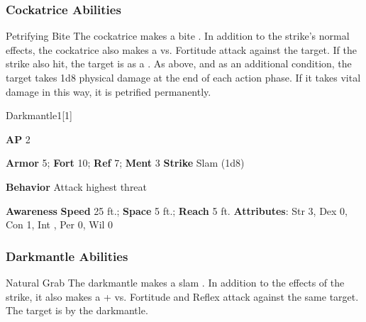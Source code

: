 \subsubsection{Cockatrice Abilities}

\begin{freeability}{Petrifying Bite}
The cockatrice makes a bite .
In addition to the strike's normal effects, the cockatrice also makes a  vs. Fortitude attack against the target.
\hit If the strike also hit, the target is  as a .
\crit As above, and as an additional condition, the target takes 1d8 physical damage at the end of each action phase.
If it takes vital damage in this way, it is petrified permanently.
\end{freeability}

\begin{monsection}{Darkmantle}{1}[1]
\vspace{-1em}\vspace{-1em}
\begin{spellcontent}
\begin{spelltargetinginfo}
{\textbf{AP} 2}

\pari \textbf{Armor} 5;
\textbf{Fort} 10;
\textbf{Ref} 7;
\textbf{Ment} 3
\pari \textbf{Strike} Slam  (1d8)



\pari \textbf{Behavior} Attack highest threat
\end{spelltargetinginfo}
\end{spellcontent}

\begin{monsterfooter}
\pari \textbf{Awareness} 
\pari \textbf{Speed} 25 ft.;
\textbf{Space} 5 ft.;
\textbf{Reach} 5 ft.
\pari \textbf{Attributes}:
Str 3,
Dex 0,
Con 1,
Int ,
Per 0,
Wil 0
\end{monsterfooter}
\end{monsection}


\subsubsection{Darkmantle Abilities}

\begin{freeability}{Natural Grab}
The darkmantle makes a slam .
In addition to the effects of the strike, it also makes a + vs. Fortitude and Reflex attack against the same target.
\hit The target is  by the darkmantle.
\end{freeability}

